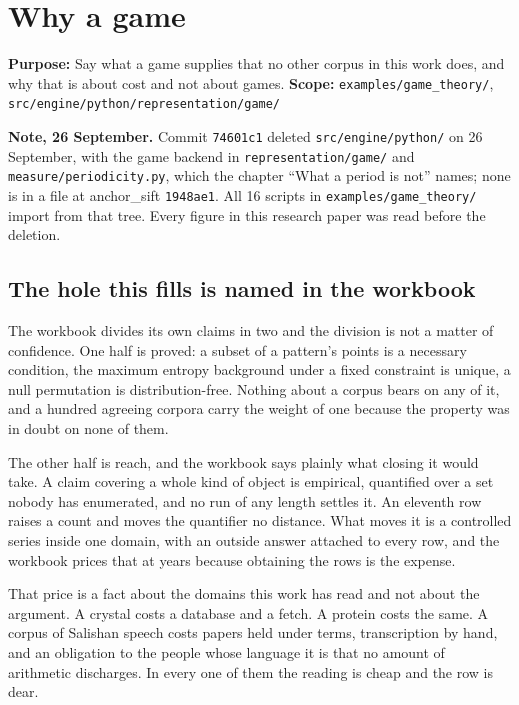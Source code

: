 \chapter{Why a game}

\textbf{Purpose:} Say what a game supplies that no other corpus in this work does, and why that is
about cost and not about games. \textbf{Scope:} \texttt{examples/\allowbreak{}game\_\allowbreak{}theory/\allowbreak{}},
\texttt{src/\allowbreak{}engine/\allowbreak{}python/\allowbreak{}representation/\allowbreak{}game/\allowbreak{}}

\textbf{Note, 26 September.} Commit \texttt{74601c1} deleted \texttt{src/\allowbreak{}engine/\allowbreak{}python/} on 26 September, with the game backend in \texttt{representation/\allowbreak{}game/} and \texttt{measure/\allowbreak{}periodicity.\allowbreak{}py}, which the chapter ``What a period is not'' names; none is in a file at anchor\_sift \texttt{1948ae1}. All 16 scripts in \texttt{examples/\allowbreak{}game\_\allowbreak{}theory/} import from that tree. Every figure in this research paper was read before the deletion.

\section{The hole this fills is named in the workbook}

The workbook divides its own claims in two and the division is not a matter of confidence. One half
is proved: a subset of a pattern's points is a necessary condition, the maximum entropy background
under a fixed constraint is unique, a null permutation is distribution-free. Nothing about a corpus
bears on any of it, and a hundred agreeing corpora carry the weight of one because the property was
in doubt on none of them.

The other half is reach, and the workbook says plainly what closing it would take. A claim covering
a whole kind of object is empirical, quantified over a set nobody has enumerated, and no run of any
length settles it. An eleventh row raises a count and moves the quantifier no distance. What moves
it is a controlled series inside one domain, with an outside answer attached to every row, and the
workbook prices that at years because obtaining the rows is the expense.

That price is a fact about the domains this work has read and not about the argument. A crystal costs
a database and a fetch. A protein costs the same. A corpus of Salishan speech costs papers held
under terms, transcription by hand, and an obligation to the people whose language it is that no
amount of arithmetic discharges. In every one of them the reading is cheap and the row is dear.

